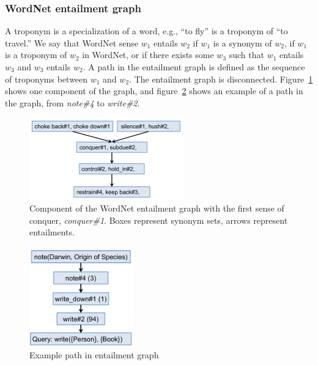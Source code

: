\documentclass{article}
\begin{document}
\subsubsection{WordNet entailment graph}
A troponym is a specialization of a word, e.g., ``to fly'' is a troponym of ``to travel.'' We say that WordNet sense $w_1$ entails $w_2$ if $w_1$ is a synonym of $w_2$, if $w_1$ is a troponym of $w_2$ in WordNet, or if there exists some $w_3$ such that $w_1$ entails $w_3$ and $w_3$ entails $w_2$. A path in the entailment graph is defined as the sequence of troponyms between $w_1$ and $w_2$. The entailment graph is disconnected. Figure~\ref{wordnet-graph} shows one component of the graph, and figure~\ref{example-path} shows an example of a path in the graph, from \textit{note\#4} to \textit{write\#2}.

\begin{figure}[h]
\begin{center}
\includegraphics[width=0.6\textwidth]{figures/wordnet-graph.pdf}
\end{center}
\caption{Component of the WordNet entailment graph with the first sense of conquer, \textit{conquer\#1}. Boxes represent synonym sets, arrows represent entailments.}\label{wordnet-graph}
\end{figure}

\begin{figure}[h]
\begin{center}
\includegraphics[width=0.4\textwidth]{figures/example-path.pdf}
\end{center}
\caption{Example path in entailment graph}\label{example-path}
\end{figure}
\end{document}
